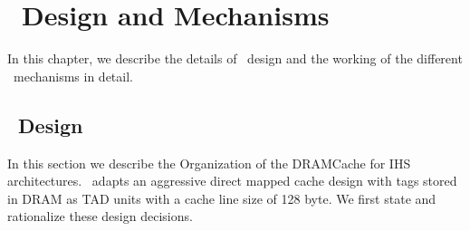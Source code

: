 \chapter{\cachename\ Design and Mechanisms} \label{chap:hashcache}
In this chapter, we describe the details of \cachename\ design and the working of the different \cachename\ mechanisms in detail.
\section{\cachename\ Design}
In this section we describe the Organization of the DRAMCache for IHS architectures. \cachename\ adapts an aggressive direct mapped cache design with tags stored in DRAM as TAD units \cite{alloy} with a cache line size of 128 byte. We first state and rationalize these design decisions.

